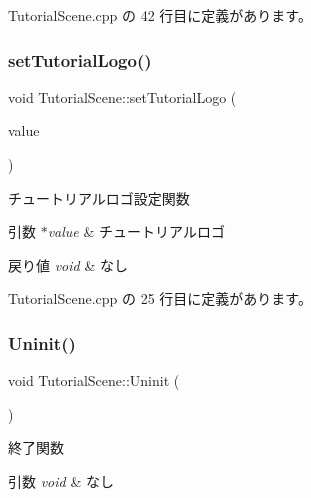  Tutorial\+Scene.\+cpp の 42 行目に定義があります。

\mbox{\label{class_tutorial_scene_a7c8b448ac848d4811e448acf45c5a48e}} 
\subsubsection{\texorpdfstring{set\+Tutorial\+Logo()}{setTutorialLogo()}}
{\footnotesize\ttfamily void Tutorial\+Scene\+::set\+Tutorial\+Logo (\begin{DoxyParamCaption}\item[{\mbox{\hyperlink{class_tutorial_logo}{Tutorial\+Logo}} $\ast$}]{value }\end{DoxyParamCaption})}



チュートリアルロゴ設定関数 


\begin{DoxyParams}{引数}
{\em $\ast$value} & チュートリアルロゴ \\
\hline
\end{DoxyParams}

\begin{DoxyRetVals}{戻り値}
{\em void} & なし \\
\hline
\end{DoxyRetVals}


 Tutorial\+Scene.\+cpp の 25 行目に定義があります。

\mbox{\label{class_tutorial_scene_a988a579b179fc989876b28e24fae7591}} 
\subsubsection{\texorpdfstring{Uninit()}{Uninit()}}
{\footnotesize\ttfamily void Tutorial\+Scene\+::\+Uninit (\begin{DoxyParamCaption}{ }\end{DoxyParamCaption})\hspace{0.3cm}{\ttfamily [virtual]}}



終了関数 


\begin{DoxyParams}{引数}
{\em void} & なし \\
\hline
\end{DoxyParams}

